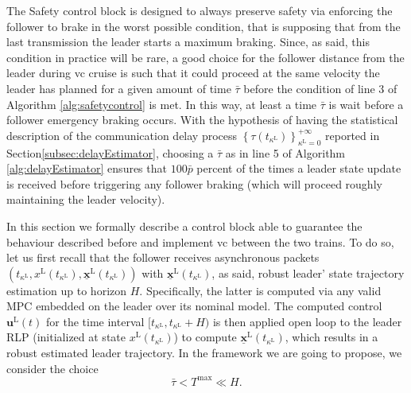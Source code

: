 The Safety control block is designed to always preserve safety via enforcing the follower to brake in the worst possible condition, that is supposing that from the last transmission the leader starts a maximum braking. Since, as said, this condition in practice will be rare, a good choice for the follower distance from the leader during \gls{vc} cruise is such that it could proceed at the same velocity the leader has planned for a given amount of time $\bar{\tau}$ before the condition of line  $3$ of  Algorithm \ref{alg:safetycontrol} is met. In this way, at least a time $\bar{\tau}$ is wait before a follower emergency braking occurs. 
With the hypothesis of having the statistical description of the communication delay process $ \left\{ \tau(t_{\kappa^\mathrm{L}})\right\}_{\kappa^\mathrm{L}=0}^{+\infty}$ reported in Section\tildeAdd\ref{subsec:delayEstimator}, 
choosing a $\bar{\tau}$ as in line 5 of Algorithm \ref{alg:delayEstimator} ensures that $100 \bar{p}$ percent of the times a leader state update is received before triggering any follower braking (which will proceed roughly maintaining the leader velocity).

In this section we formally describe a control block able to guarantee the behaviour described before and implement \gls{vc} between the two trains.  
To do so, let us first recall that the follower receives asynchronous packets $\left ( t_{\kappa^\mathrm{L}}, x^\mathrm{L}(t_{\kappa^\mathrm{L}}),\underline{\mathbf{x}}^\mathrm{L}(t_{\kappa^\mathrm{L}})\right)$ with $\underline{\mathbf{x}}^\mathrm{L}(t_{\kappa^\mathrm{L}})$, as said, robust leader' state trajectory estimation up to horizon $H$. Specifically, the latter is computed via any valid MPC embedded on the leader over its nominal model. The computed control $\mathbf{u}^\mathrm{L}(t)$ for the time interval  $[t_{\kappa^\mathrm{L}},t_{\kappa^\mathrm{L}}+H)$ is then applied open loop to the leader RLP (initialized at state $x^\mathrm{L}(t_{\kappa^\mathrm{L}})$) to compute $\underline{\mathbf{x}}^\mathrm{L}(t_{\kappa^\mathrm{L}})$, which results in a robust estimated leader trajectory. 
In the framework we are going to propose, we consider the choice
\begin{equation}\label{eq:tau_H_inequality}
	\bar{\tau} < T^{\max}\ll H.
\end{equation}

